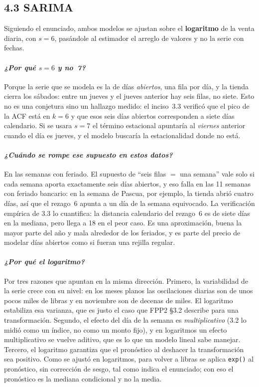 \documentclass[11pt]{article}
\begin{document}
\subsection{4.3 SARIMA}

Siguiendo el enunciado, ambos modelos se ajustan sobre el \textbf{logaritmo}
de la venta diaria, con $s=6$, pas\'andole al estimador el arreglo de valores
y no la serie con fechas.

\paragraph{{\normalfont\itshape ¿Por qu\'e $s=6$ y no~7?}} Porque la serie
que se modela es la de d\'ias \emph{abiertos}, una fila por d\'ia, y la
tienda cierra los s\'abados: entre un jueves y el jueves anterior hay seis
filas, no siete. Esto no es una conjetura sino un hallazgo medido: el
inciso~3.3 verific\'o que el pico de la ACF est\'a en $k=6$ y que esos seis
d\'ias abiertos corresponden a siete d\'ias calendario. Si se usara $s=7$ el
t\'ermino estacional apuntar\'ia al \emph{viernes} anterior cuando el d\'ia
es jueves, y el modelo buscar\'ia la estacionalidad donde no est\'a.

\paragraph{{\normalfont\itshape ¿Cu\'ando se rompe ese supuesto en estos
datos?}} En las semanas con feriado. El supuesto de ``seis filas $=$ una
semana'' vale solo si cada semana aporta exactamente seis d\'ias abiertos, y
eso falla en las \num{11} semanas con feriado bancario: en la semana de
Pascua, por ejemplo, la tienda abri\'o cuatro d\'ias, as\'i que el rezago~6
apunta a un d\'ia de la semana equivocado. La verificaci\'on emp\'irica de
3.3 lo cuantifica: la distancia calendario del rezago~6 es de siete d\'ias en
la mediana, pero llega a \num{18} en el peor caso. Es una aproximaci\'on,
buena la mayor parte del a\~no y mala alrededor de los feriados, y es parte
del precio de modelar d\'ias abiertos como si fueran una rejilla regular.

\paragraph{{\normalfont\itshape ¿Por qu\'e el logaritmo?}} Por tres razones
que apuntan en la misma direcci\'on. Primero, la variabilidad de la serie
crece con su nivel: en los meses planos las oscilaciones diarias son de unos
pocos miles de libras y en noviembre son de decenas de miles. El logaritmo
estabiliza esa varianza, que es justo el caso que FPP2 \S3.2 describe para
una transformaci\'on. Segundo, el efecto del d\'ia de la semana es
\emph{multiplicativo} (3.2 lo midi\'o como un \'indice, no como un monto
fijo), y en logaritmos un efecto multiplicativo se vuelve aditivo, que es lo
que un modelo lineal sabe manejar. Tercero, el logaritmo garantiza que el
pron\'ostico al deshacer la transformaci\'on sea positivo. Como se ajust\'o
en logaritmos, para volver a libras se aplica \texttt{exp()} al pron\'ostico,
sin correcci\'on de sesgo, tal como indica el enunciado; con eso el
pron\'ostico es la mediana condicional y no la media.
\end{document}
